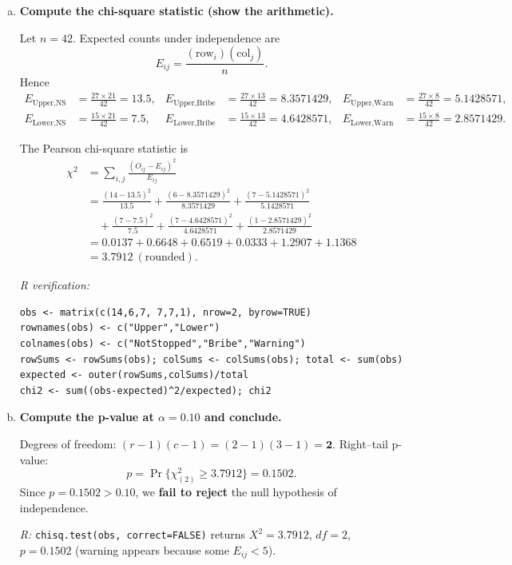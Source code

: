 \documentclass[12pt,letterpaper]{article}
\begin{document}
\begin{enumerate}[(a)]
\item \textbf{Compute the chi-square statistic (show the arithmetic).}

Let $n=42$. Expected counts under independence are
\[
E_{ij}=\frac{(\text{row}_i)(\text{col}_j)}{n}.
\]
Hence
\begin{align*}
E_{\text{Upper,NS}} &= \frac{27\times 21}{42}=13.5, &
E_{\text{Upper,Bribe}} &= \frac{27\times 13}{42}=8.3571429, &
E_{\text{Upper,Warn}} &= \frac{27\times 8}{42}=5.1428571,\\
E_{\text{Lower,NS}} &= \frac{15\times 21}{42}=7.5, &
E_{\text{Lower,Bribe}} &= \frac{15\times 13}{42}=4.6428571, &
E_{\text{Lower,Warn}} &= \frac{15\times 8}{42}=2.8571429.
\end{align*}

The Pearson chi-square statistic is
\begin{align*}
\chi^2 &= \sum_{i,j}\frac{(O_{ij}-E_{ij})^2}{E_{ij}} \\
&= \frac{(14-13.5)^2}{13.5}
 + \frac{(6-8.3571429)^2}{8.3571429}
 + \frac{(7-5.1428571)^2}{5.1428571}\\
&\quad + \frac{(7-7.5)^2}{7.5}
 + \frac{(7-4.6428571)^2}{4.6428571}
 + \frac{(1-2.8571429)^2}{2.8571429}\\
&= 0.0137 + 0.6648 + 0.6519 + 0.0333 + 1.2907 + 1.1368\\
&= \mathbf{3.7912} \ (\text{rounded}).
\end{align*}

\textit{R verification:}
\begin{lstlisting}[caption={Q1(a) R verification}]
obs <- matrix(c(14,6,7, 7,7,1), nrow=2, byrow=TRUE)
rownames(obs) <- c("Upper","Lower")
colnames(obs) <- c("NotStopped","Bribe","Warning")
rowSums <- rowSums(obs); colSums <- colSums(obs); total <- sum(obs)
expected <- outer(rowSums,colSums)/total
chi2 <- sum((obs-expected)^2/expected); chi2
\end{lstlisting}

\item \textbf{Compute the p-value at $\alpha=0.10$ and conclude.}

Degrees of freedom: $(r-1)(c-1)=(2-1)(3-1)=\mathbf{2}$.  
Right--tail p-value:
\[
p = \Pr\{\chi^2_{(2)} \ge 3.7912\} = \mathbf{0.1502}.
\]
Since $p=0.1502>0.10$, we \textbf{fail to reject} the null hypothesis of independence.

\textit{R:} \verb|chisq.test(obs, correct=FALSE)| returns $X^2=3.7912$, $df=2$, $p=0.1502$ (warning appears because some $E_{ij}<5$).


\end{enumerate}
\end{document}
